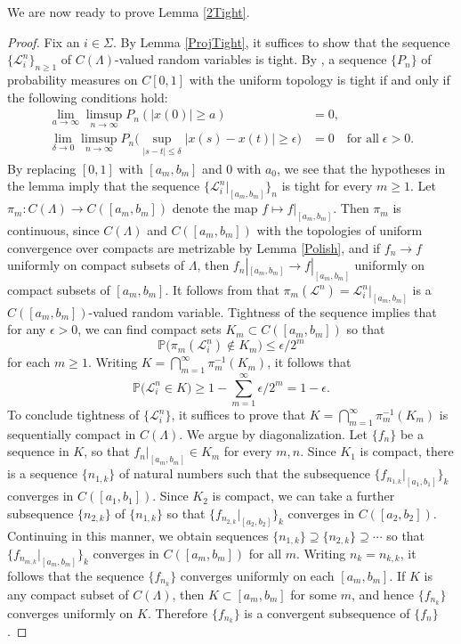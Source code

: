 We are now ready to prove Lemma \ref{2Tight}.

\begin{proof}
	
Fix an $i\in\Sigma$. By Lemma \ref{ProjTight}, it suffices to show that the sequence $\{\mathcal{L}_i^n\}_{n\geq 1}$ of $C(\Lambda)$-valued random variables is tight. By \cite[Theorem 7.3]{Billing}, a sequence $\{P_n\}$ of probability measures on $C[0,1]$ with the uniform topology is tight if and only if the following conditions hold:
\begin{align*}
\lim_{a\to\infty} \limsup_{n\to\infty} P_n(|x(0)|\geq a) &= 0, \\
\lim_{\delta\to 0} \limsup_{n\to\infty} P_n\Big(\sup_{|s-t|\leq\delta} |x(s)-x(t)| \geq \epsilon\Big) &= 0 \quad \textrm{for all}\;\epsilon>0.
\end{align*}
By replacing $[0,1]$ with $[a_m,b_m]$ and 0 with $a_0$, we see that the hypotheses in the lemma imply that the sequence $\{\mathcal{L}_i^n|_{[a_m,b_m]}\}_n$ is tight for every $m\geq 1$. Let $\pi_m : C(\Lambda) \to C([a_m,b_m])$ denote the map $f \mapsto f|_{[a_m,b_m]}$. Then $\pi_m$ is continuous, since $C(\Lambda)$ and $C([a_m,b_m])$ with the topologies of uniform convergence over compacts are metrizable by Lemma \ref{Polish}, and if $f_n\to f$ uniformly on compact subsets of $\Lambda$, then $f_n|_{[a_m,b_m]} \to f|_{[a_m,b_m]}$ uniformly on compact subsets of $[a_m,b_m]$. It follows from \cite[Theorem 1.3.5]{Durrett} that $\pi_m(\mathcal{L}^n) = \mathcal{L}_i^n|_{[a_m,b_m]}$ is a $C([a_m,b_m])$-valued random variable. Tightness of the sequence implies that for any $\epsilon > 0$, we can find compact sets $K_m\subset C([a_m,b_m])$ so that
\[
\mathbb{P}\big(\pi_m(\mathcal{L}_i^n) \notin K_m \big) \leq \epsilon/2^m
\]
for each $m\geq 1$. Writing $K = \bigcap_{m=1}^\infty \pi_m^{-1}(K_m)$, it follows that
\[
\mathbb{P}\big(\mathcal{L}^n_i \in K\big) \geq 1 - \sum_{m=1}^\infty \epsilon/2^m = 1 - \epsilon.
\]
To conclude tightness of $\{\mathcal{L}_i^n\}$, it suffices to prove that $K = \bigcap_{m=1}^\infty \pi_m^{-1}(K_m)$ is sequentially compact in $C(\Lambda)$. We argue by diagonalization. Let $\{f_n\}$ be a sequence in $K$, so that $f_n|_{[a_m,b_m]} \in K_m$ for every $m,n$. Since $K_1$ is compact, there is a sequence $\{n_{1,k}\}$ of natural numbers such that the subsequence $\{f_{n_{1,k}}|_{[a_1,b_1]}\}_k$ converges in $C([a_1,b_1])$. Since $K_2$ is compact, we can take a further subsequence $\{n_{2,k}\}$ of $\{n_{1,k}\}$ so that $\{f_{n_{2,k}}|_{[a_2,b_2]}\}_k$ converges in $C([a_2,b_2])$. Continuing in this manner, we obtain sequences $\{n_{1,k}\} \supseteq \{n_{2,k}\} \supseteq\cdots$ so that $\{f_{n_{m,k}}|_{[a_m,b_m]}\}_k$ converges in $C([a_m,b_m])$ for all $m$. Writing $n_k = n_{k,k}$, it follows that the sequence $\{f_{n_k}\}$ converges uniformly on each $[a_m,b_m]$. If $K$ is any compact subset of $C(\Lambda)$, then $K\subset [a_m,b_m]$ for some $m$, and hence $\{f_{n_k}\}$ converges uniformly on $K$. Therefore $\{f_{n_k}\}$ is a convergent subsequence of $\{f_n\}$.

\end{proof}
